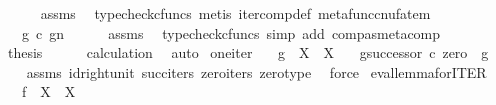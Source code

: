 \begin{isabellebody}
\ \ \ \ \isamarkupfalse%
\ assms\ \isamarkupfalse%
\ {\isacharparenleft}{\kern0pt}typecheck{\isacharunderscore}{\kern0pt}cfuncs{\isacharcomma}{\kern0pt}\ metis\ iter{\isacharunderscore}{\kern0pt}comp{\isacharunderscore}{\kern0pt}def{}\ metafunc{\isacharunderscore}{\kern0pt}cnufatem{\isacharparenright}{\kern0pt}\isanewline
\ \ \isamarkupfalse%
\ \isamarkupfalse%
\ {\isachardoublequoteopen}{\isachardot}{\kern0pt}{\isachardot}{\kern0pt}{\isachardot}{\kern0pt}\ {\isacharequal}{\kern0pt}\ g\ {\isasymcirc}\isactrlsub c\ {\isacharparenleft}{\kern0pt}g\isactrlbsup {\isasymcirc}n\isactrlesup {\isacharparenright}{\kern0pt}{\isachardoublequoteclose}\isanewline
\ \ \ \ \isamarkupfalse%
\ assms\ \isamarkupfalse%
\ {\isacharparenleft}{\kern0pt}typecheck{\isacharunderscore}{\kern0pt}cfuncs{\isacharcomma}{\kern0pt}\ simp\ add{\isacharcolon}{\kern0pt}\ comp{\isacharunderscore}{\kern0pt}as{\isacharunderscore}{\kern0pt}metacomp{\isacharparenright}{\kern0pt}\isanewline
\ \ \isamarkupfalse%
\ \isamarkupfalse%
\ {\isacharquery}{\kern0pt}thesis\isanewline
\ \ \ \ \isamarkupfalse%
\ calculation\ \isamarkupfalse%
\ auto\isanewline
{}\isamarkupfalse%
%
\endisatagproof
{\isafoldproof}%
%
\isadelimproof
\isanewline
%
\endisadelimproof
\isanewline
{}\isamarkupfalse%
\ one{\isacharunderscore}{\kern0pt}iter{\isacharcolon}{\kern0pt}\isanewline
\ \ \ {\isachardoublequoteopen}g\ {\isacharcolon}{\kern0pt}\ X\ {\isasymrightarrow}\ X{\isachardoublequoteclose}\isanewline
\ \ \ {\isachardoublequoteopen}g\isactrlbsup {\isasymcirc}{\isacharparenleft}{\kern0pt}successor\ {\isasymcirc}\isactrlsub c\ zero{\isacharparenright}{\kern0pt}\isactrlesup \ {\isacharequal}{\kern0pt}\ g{\isachardoublequoteclose}\isanewline
%
\isadelimproof
\ \ %
\endisadelimproof
%
\isatagproof
{}\isamarkupfalse%
\ assms\ id{\isacharunderscore}{\kern0pt}right{\isacharunderscore}{\kern0pt}unit{}\ succ{\isacharunderscore}{\kern0pt}iters\ zero{\isacharunderscore}{\kern0pt}iters\ zero{\isacharunderscore}{\kern0pt}type\ \isamarkupfalse%
\ force%
\endisatagproof
{\isafoldproof}%
%
\isadelimproof
\isanewline
%
\endisadelimproof
\isanewline
{}\isamarkupfalse%
\ eval{\isacharunderscore}{\kern0pt}lemma{\isacharunderscore}{\kern0pt}for{\isacharunderscore}{\kern0pt}ITER{\isacharcolon}{\kern0pt}\isanewline
\ \ \ {\isachardoublequoteopen}f\ {\isacharcolon}{\kern0pt}\ X\ {\isasymrightarrow}\ X{\isachardoublequoteclose}\isanewline

\end{isabellebody}
